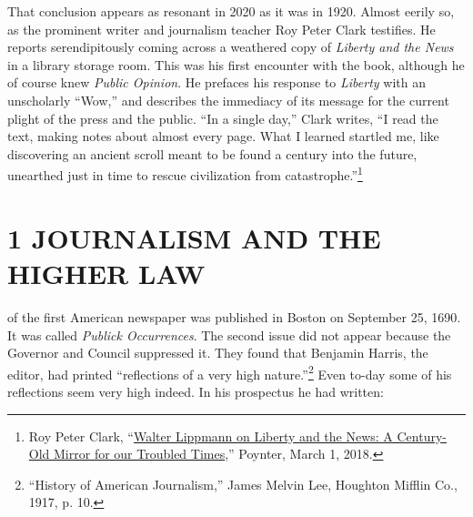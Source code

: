 \documentclass[openany,nobib,twoside,nohyper]{tufte-book}
\let\oldchapter\chapter
\def\chapter{%
  \setcounter{footnote}{0}%
  \oldchapter
}
\begin{document}
That conclusion appears as resonant in 2020 as it was in 1920. Almost
eerily so, as the prominent writer and journalism teacher Roy Peter Clark
testifies. He reports serendipitously coming across a weathered copy of
\emph{Liberty and the News} in a library storage room. This was his
first encounter with the book, although he of course knew \emph{Public
Opinion}. He prefaces his response to \emph{Liberty} with an unscholarly
``Wow,'' and describes the immediacy of its message for the current
plight of the press and the public. ``In a single day,'' Clark writes,
``I read the text, making notes about almost every page. What I learned
startled me, like discovering an ancient scroll meant to be found a
century into the future, unearthed just in time to rescue civilization
from catastrophe.''\footnote{Roy Peter Clark, ``\href{https://www.poynter.org/ethics-trust/2018/walter-lippmann-on-liberty-and-the-news-a-century-old-mirror-for-our-troubled-times/}{Walter Lippmann on Liberty and the News: A
  Century-Old Mirror for our Troubled Times},'' Poynter, March 1, 2018.}


\newpage
\begin{fullwidth}


\thispagestyle{empty}

\begingroup
\setlength{\parindent}{10pt}


\endgroup

\end{fullwidth}

\mainmatter{}\setcounter{page}{1}


\chapter[1 \hspace*{1mm} JOURNALISM AND THE HIGHER LAW]{1 JOURNALISM AND THE HIGHER LAW}
\label{ch:JOURNALISM}

 of the first American newspaper was published in
Boston on September 25, 1690. It was called \emph{Publick Occurrences}.
The second issue did not appear because the Governor and Council
suppressed it. They found that Benjamin Harris, the editor, had printed
``reflections of a very high
nature.''\footnote{``History of American Journalism,'' James Melvin Lee, Houghton Mifflin
  Co., 1917, p. 10.} Even to-day some of his
reflections seem very high indeed. In his prospectus he had written:
\end{document}
